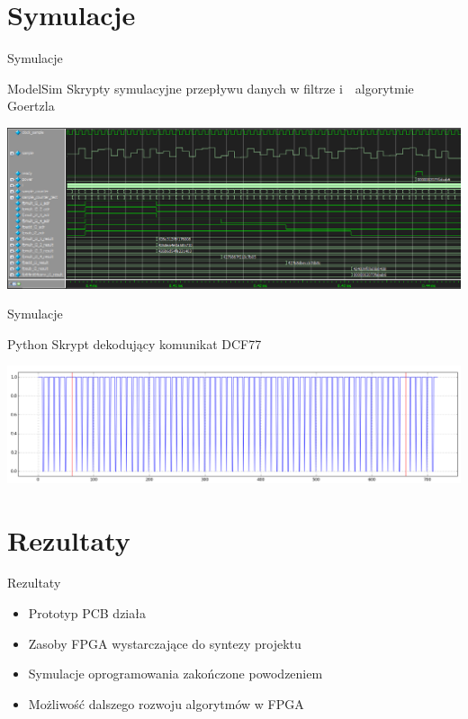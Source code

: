 \section{Symulacje}
\begin{frame}{Symulacje}
	\begin{block}{ModelSim}
		Skrypty symulacyjne przepływu danych w filtrze i~~algorytmie Goertzla
	\end{block}
	\scalebox{0.40}
	{\includegraphics[trim={0 0 15cm 0},clip]{images/sim-goertzel-result}}
\end{frame}

\begin{frame}{Symulacje}
	\begin{block}{Python}
		Skrypt dekodujący komunikat DCF77
	\end{block}
	\scalebox{0.40}
	{\includegraphics[trim={0 0 20cm 0},clip]{images/sim-find}}
\end{frame}

\section{Rezultaty}
\begin{frame}{Rezultaty}
	\begin{itemize}
		\item Prototyp PCB działa
		\item Zasoby FPGA wystarczające do syntezy projektu
		\item Symulacje oprogramowania zakończone powodzeniem
		\item Możliwość dalszego rozwoju algorytmów w FPGA
	\end{itemize} 
\end{frame}

